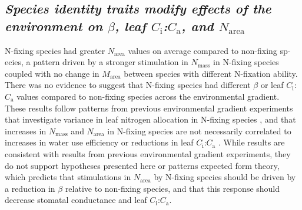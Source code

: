 \subsection{\textit{Species identity traits modify effects of the environment on $\beta$, leaf $C_\mathrm{i}$:$C_\mathrm{a}$, and $N_\mathrm{area}$}}
\noindent N-fixing species had greater $N_\mathrm{area}$ values on average compared to non-fixing sp-ecies, a pattern driven by a stronger stimulation in $N_\mathrm{mass}$ in N-fixing species coupled with no change in $M_\mathrm{area}$ between species with different N-fixation ability. There was no evidence to suggest that N-fixing species had different $\beta$ or leaf $C_\mathrm{i}$:$C_\mathrm{a}$ values compared to non-fixing species across the environmental gradient. These results follow patterns from previous environmental gradient experiments that investigate variance in leaf nitrogen allocation in N-fixing species , and that increases in $N_\mathrm{mass}$ and $N_\mathrm{area}$ in N-fixing species are not necessarily correlated to increases in water use efficiency or reductions in leaf $C_\mathrm{i}$:$C_\mathrm{a}$ . While results are consistent with results from previous environmental gradient experiments, they do not support hypotheses presented here or patterns expected form theory, which predicts that stimulations in $N_\mathrm{area}$ by N-fixing species should be driven by a reduction in $\beta$ relative to non-fixing species, and that this response should decrease stomatal conductance and leaf $C_\mathrm{i}$:$C_\mathrm{a}$.
    
